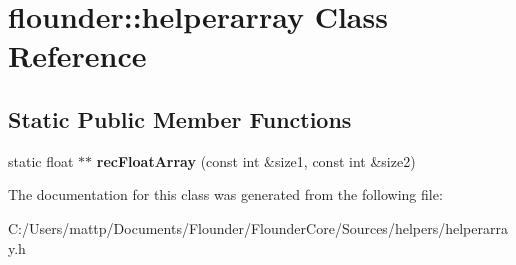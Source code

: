 \hypertarget{classflounder_1_1helperarray}{}\section{flounder\+:\+:helperarray Class Reference}
\label{classflounder_1_1helperarray}
\subsection*{Static Public Member Functions}
\begin{DoxyCompactItemize}
\item 
\mbox{\label{classflounder_1_1helperarray_a0a0bb008d5879a1f43eb87efbc30971b}} 
static float $\ast$$\ast$ {\bfseries rec\+Float\+Array} (const int \&size1, const int \&size2)
\end{DoxyCompactItemize}


The documentation for this class was generated from the following file\+:\begin{DoxyCompactItemize}
\item 
C\+:/\+Users/mattp/\+Documents/\+Flounder/\+Flounder\+Core/\+Sources/helpers/helperarray.\+h\end{DoxyCompactItemize}

